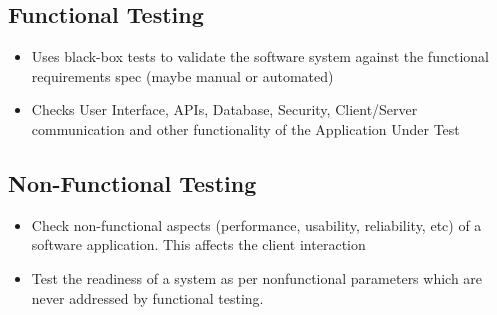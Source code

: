 \documentclass{article}
\begin{document}
\subsection{Functional Testing}
\begin{itemize}
    \item Uses black-box tests to validate the software system against the functional requirements spec (maybe manual or automated)
    
    \item Checks User Interface, APIs, Database, Security, Client/Server communication and other functionality of the Application Under Test
\end{itemize}

\subsection{Non-Functional Testing}
\begin{itemize}
    \item Check non-functional aspects (performance, usability, reliability, etc) of a software application. This affects the client interaction
    
    \item Test the readiness of a system as per nonfunctional parameters which are never addressed by functional testing.
\end{itemize}
\end{document}
